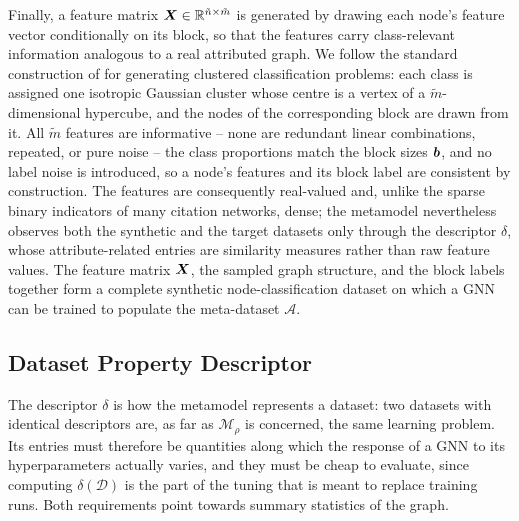 Finally, a feature matrix \( \boldsymbol{X} \in \mathbb{R}^{\tilde{n} \times \tilde{m}} \) is generated by drawing each node's feature vector conditionally on its block, so that the features carry class-relevant information analogous to a real attributed graph. We follow the standard construction of \cite{guyon_design_2003} for generating clustered classification problems: each class is assigned one isotropic Gaussian cluster whose centre is a vertex of a \( \tilde{m} \)-dimensional hypercube, and the nodes of the corresponding block are drawn from it. All \( \tilde{m} \) features are informative -- none are redundant linear combinations, repeated, or pure noise -- the class proportions match the block sizes \( \boldsymbol{b} \), and no label noise is introduced, so a node's features and its block label are consistent by construction. The features are consequently real-valued and, unlike the sparse binary indicators of many citation networks, dense; the metamodel nevertheless observes both the synthetic and the target datasets only through the descriptor \( \delta \), whose attribute-related entries are similarity measures rather than raw feature values. The feature matrix \( \boldsymbol{X} \), the sampled graph structure, and the block labels together form a complete synthetic node-classification dataset on which a GNN can be trained to populate the meta-dataset \( \mathcal{A} \).

\subsection{Dataset Property Descriptor}

The descriptor \( \delta \) is how the metamodel represents a dataset: two datasets with identical descriptors are, as far as \( \mathcal{M}_\rho \) is concerned, the same learning problem. Its entries must therefore be quantities along which the response of a GNN to its hyperparameters actually varies, and they must be cheap to evaluate, since computing \( \delta \left( \mathcal{D} \right) \) is the part of the tuning that is meant to replace training runs. Both requirements point towards summary statistics of the graph.

